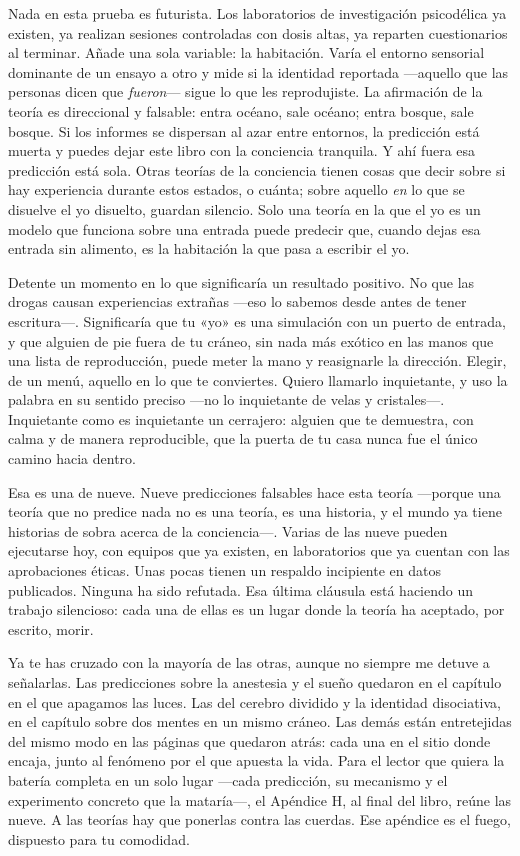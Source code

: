 \documentclass[11pt, twoside, openright]{book}
\begin{document}
Nada en esta prueba es futurista. Los laboratorios de investigación psicodélica ya existen, ya realizan sesiones controladas con dosis altas, ya reparten cuestionarios al terminar. Añade una sola variable: la habitación. Varía el entorno sensorial dominante de un ensayo a otro y mide si la identidad reportada ---aquello que las personas dicen que \textit{fueron}--- sigue lo que les reprodujiste. La afirmación de la teoría es direccional y falsable: entra océano, sale océano; entra bosque, sale bosque. Si los informes se dispersan al azar entre entornos, la predicción está muerta y puedes dejar este libro con la conciencia tranquila. Y ahí fuera esa predicción está sola. Otras teorías de la conciencia tienen cosas que decir sobre si hay experiencia durante estos estados, o cuánta; sobre aquello \textit{en} lo que se disuelve el yo disuelto, guardan silencio. Solo una teoría en la que el yo es un modelo que funciona sobre una entrada puede predecir que, cuando dejas esa entrada sin alimento, es la habitación la que pasa a escribir el yo.

Detente un momento en lo que significaría un resultado positivo. No que las drogas causan experiencias extrañas ---eso lo sabemos desde antes de tener escritura---. Significaría que tu «yo» es una simulación con un puerto de entrada, y que alguien de pie fuera de tu cráneo, sin nada más exótico en las manos que una lista de reproducción, puede meter la mano y reasignarle la dirección. Elegir, de un menú, aquello en lo que te conviertes. Quiero llamarlo inquietante, y uso la palabra en su sentido preciso ---no lo inquietante de velas y cristales---. Inquietante como es inquietante un cerrajero: alguien que te demuestra, con calma y de manera reproducible, que la puerta de tu casa nunca fue el único camino hacia dentro.

Esa es una de nueve. Nueve predicciones falsables hace esta teoría ---porque una teoría que no predice nada no es una teoría, es una historia, y el mundo ya tiene historias de sobra acerca de la conciencia---. Varias de las nueve pueden ejecutarse hoy, con equipos que ya existen, en laboratorios que ya cuentan con las aprobaciones éticas. Unas pocas tienen un respaldo incipiente en datos publicados. Ninguna ha sido refutada. Esa última cláusula está haciendo un trabajo silencioso: cada una de ellas es un lugar donde la teoría ha aceptado, por escrito, morir.

Ya te has cruzado con la mayoría de las otras, aunque no siempre me detuve a señalarlas. Las predicciones sobre la anestesia y el sueño quedaron en el capítulo en el que apagamos las luces. Las del cerebro dividido y la identidad disociativa, en el capítulo sobre dos mentes en un mismo cráneo. Las demás están entretejidas del mismo modo en las páginas que quedaron atrás: cada una en el sitio donde encaja, junto al fenómeno por el que apuesta la vida. Para el lector que quiera la batería completa en un solo lugar ---cada predicción, su mecanismo y el experimento concreto que la mataría---, el Apéndice H, al final del libro, reúne las nueve. A las teorías hay que ponerlas contra las cuerdas. Ese apéndice es el fuego, dispuesto para tu comodidad.
\end{document}
